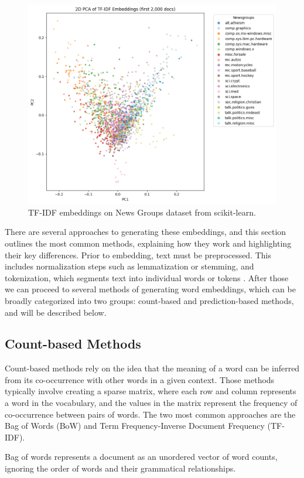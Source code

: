 \documentclass{SGGW-thesis-EN}
\begin{document}
\begin{figure}[h!]
  \centering
    \includegraphics[height=9cm]{images/tfidf_embeddings.png}
    \caption{TF-IDF embeddings on News Groups dataset from scikit-learn.}
    \label{fig:tfidf_embeddings}
  \end{figure}

\newpage 
There are several approaches to generating these embeddings, and this section outlines the most common methods, explaining how they work and highlighting their key differences.
Prior to embedding, text must be preprocessed. This includes normalization steps such as lemmatization or stemming, and tokenization, which segments text into individual words or tokens \cite{jurafsky2023slp3}.
After those we can proceed to several methods of generating word embeddings, which can be broadly categorized into two groups: count-based and prediction-based methods, and will be described below.

\subsection{Count-based Methods}
Count-based methods rely on the idea that the meaning of a word can be inferred from its co-occurrence with other words in a given context.
Those methods typically involve creating a sparse matrix, where each row and column represents a word in the vocabulary, and the values in the matrix represent the frequency of co-occurrence between pairs of words.
The two most common approaches are the Bag of Words (BoW) and Term Frequency-Inverse Document Frequency (TF-IDF)\cite{jurafsky2023slp3}.

Bag of words represents a document as an unordered vector of word counts, ignoring the order of words and their grammatical relationships.
\end{document}

